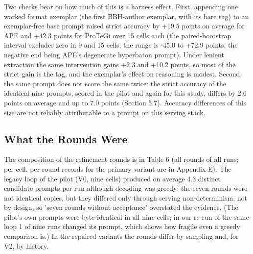 \documentclass{ieeeaccess}
\begin{document}
Two checks bear on how much of this is a harness effect. First, appending one worked format exemplar (the first BBH-author exemplar, with its bare tag) to an exemplar-free base prompt raised strict accuracy by +19.5 points on average for APE and +42.3 points for ProTeGi over 15 cells each (the paired-bootstrap interval excludes zero in 9 and 15 cells; the range is -45.0 to +72.9 points, the negative end being APE's degenerate hyperbaton prompt). Under lenient extraction the same intervention gains +2.3 and +10.2 points, so most of the strict gain is the tag, and the exemplar's effect on reasoning is modest. Second, the same prompt does not score the same twice: the strict accuracy of the identical nine prompts, scored in the pilot and again for this study, differs by 2.6 points on average and up to 7.0 points (Section 5.7). Accuracy differences of this size are not reliably attributable to a prompt on this serving stack.

\subsection{What the Rounds Were}

The composition of the refinement rounds is in Table 6 (all rounds of all runs; per-cell, per-round records for the primary variant are in Appendix E). The legacy loop of the pilot (V0, nine cells) produced on average 4.3 distinct candidate prompts per run although decoding was greedy: the seven rounds were not identical copies, but they differed only through serving non-determinism, not by design, so 'seven rounds without acceptance' overstated the evidence. (The pilot's own prompts were byte-identical in all nine cells; in our re-run of the same loop 1 of nine runs changed its prompt, which shows how fragile even a greedy comparison is.) In the repaired variants the rounds differ by sampling and, for V2, by history.
\end{document}
